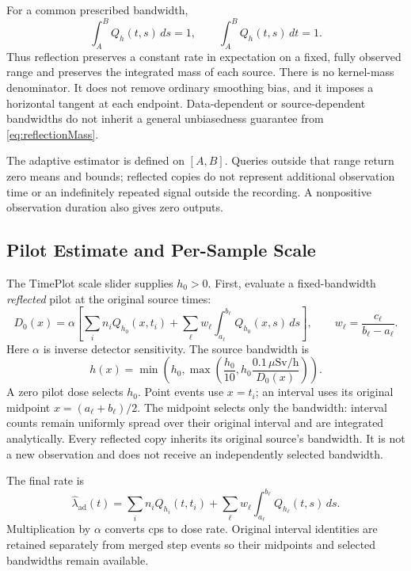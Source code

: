 \documentclass[11pt,a4paper]{article}
\begin{document}
For a common prescribed bandwidth,
\begin{equation}
  \int_A^B Q_h(t,s)\,ds=1,
  \qquad
  \int_A^B Q_h(t,s)\,dt=1.
  \label{eq:reflectionMass}
\end{equation}
Thus reflection preserves a constant rate in expectation on a fixed,
fully observed range and preserves the integrated mass of each source.
There is no kernel-mass denominator.  It does not remove ordinary
smoothing bias, and it imposes a horizontal tangent at each endpoint.
Data-dependent or source-dependent bandwidths do not inherit a general
unbiasedness guarantee from \eqref{eq:reflectionMass}.

The adaptive estimator is defined on $[A,B]$.  Queries outside that range
return zero means and bounds; reflected copies do not represent additional
observation time or an indefinitely repeated signal outside the recording.
A nonpositive observation duration also gives zero outputs.

\subsection{Pilot Estimate and Per-Sample Scale}

The TimePlot scale slider supplies $h_0>0$.  First, evaluate a
fixed-bandwidth \emph{reflected} pilot at the original source times:
\begin{equation}
  D_0(x)=\alpha\left[
      \sum_i n_i Q_{h_0}(x,t_i)
      +\sum_\ell w_\ell\int_{a_\ell}^{b_\ell}Q_{h_0}(x,s)\,ds
    \right],
  \qquad w_\ell=\frac{c_\ell}{b_\ell-a_\ell}.
  \label{eq:reflectedPilot}
\end{equation}
Here $\alpha$ is inverse detector sensitivity.  The source bandwidth is
\begin{equation}
  h(x)=\min\!\left(h_0,
       \max\!\left(\frac{h_0}{10},
              h_0\frac{0.1\,\mu\mathrm{Sv/h}}{D_0(x)}\right)\right).
  \label{eq:adaptiveScale}
\end{equation}
A zero pilot dose selects $h_0$.  Point events use $x=t_i$; an interval
uses its original midpoint $x=(a_\ell+b_\ell)/2$.  The midpoint selects
only the bandwidth: interval counts remain uniformly spread over their
original interval and are integrated analytically.  Every reflected copy
inherits its original source's bandwidth.  It is not a new observation
and does not receive an independently selected bandwidth.

The final rate is
\begin{equation}
  \hat\lambda_{\mathrm{ad}}(t)
  =\sum_i n_i Q_{h_i}(t,t_i)
    +\sum_\ell w_\ell\int_{a_\ell}^{b_\ell}Q_{h_\ell}(t,s)\,ds.
  \label{eq:adaptiveMean}
\end{equation}
Multiplication by $\alpha$ converts cps to dose rate.  Original interval
identities are retained separately from merged step events so their
midpoints and selected bandwidths remain available.
\end{document}
